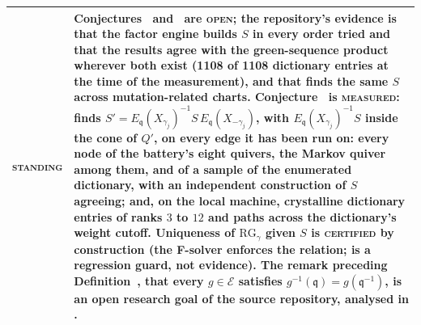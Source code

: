 \documentclass[11pt]{amsart}
\makeatletter
\newcommand\RG{\mathrm{RG}}
\newcommand\fq{\mathfrak{q}}
\newcommand\cE{{\mathcal E}}
\theoremstyle{remark}
\newcommand{\pref}[1]{\@ifundefined{r@P-#1}{\textup{[\texttt{\detokenize{#1}}]}}{\ref{P-#1}}}
\newcommand{\CERTIFIED}{\textsc{certified}}
\newcommand{\MEASURED}{\textsc{measured}}
\newcommand{\OPEN}{\textsc{open}}
\newenvironment{machinery}{%
  \leavevmode\par\medskip\noindent
  \begin{tabular}{@{}>{\scshape}p{2.1cm}>{\raggedright\arraybackslash}p{\dimexpr\linewidth-2.5cm\relax}@{}}\toprule}%
  {\bottomrule\end{tabular}\par\medskip}
\makeatother
\begin{document}
\begin{machinery}
standing & Conjectures~\pref{conj:S-unique} and~\pref{conj:pbw} are \OPEN{}; the repository's evidence is that the factor engine builds $S$ in every order tried and that the results agree with the green-sequence product wherever both exist (1108 of 1108 dictionary entries at the time of the measurement), and that \code{verify_spec_equivalence} finds the same $S$ across mutation-related charts.  Conjecture~\pref{conj:mut} is \MEASURED{}: \code{mutation_s_relation.compare_edge} finds $S'=E_\fq(X_{\gamma_j})^{-1}S\,E_\fq(X_{-\gamma_j})$, with $E_\fq(X_{\gamma_j})^{-1}S$ inside the cone of $Q'$, on every edge it has been run on: every node of the battery's eight quivers, the Markov quiver among them, and of a sample of the enumerated dictionary, with an independent construction of $S$ agreeing; and, on the local machine, crystalline dictionary entries of ranks $3$ to $12$ and paths across the dictionary's weight cutoff.  Uniqueness of $\RG_\gamma$ given $S$ is \CERTIFIED{} by construction (the F-solver enforces the relation; \code{verify_F_S_leading} is a regression guard, not evidence).  The remark preceding Definition~\pref{def:sw}, that every $g\in\cE$ satisfies $g^{-1}(\fq)=g(\fq^{-1})$, is an open research goal of the source repository, analysed in \file{notes/pronilpotent_group_conjecture.md}. \\
\end{machinery}
\end{document}
